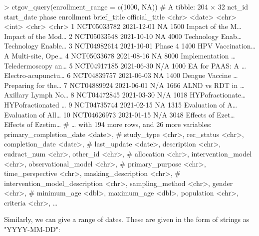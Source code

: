 \begin{example}
> ctgov_query(enrollment_range = c(1000, NA))
# A tibble: 204 × 32
   nct_id      start_date phase   enrollment brief_title      official_title
   <chr>       <date>     <chr>        <int> <chr>            <chr>
 1 NCT05033782 2021-12-01 NA            1500 Impact of the M… Impact of the Mod…
 2 NCT05033548 2021-10-10 NA            4000 Technology Enab… Technology Enable…
 3 NCT04982614 2021-10-01 Phase 4       1400 HPV Vaccination… A Multi-site, Ope…
 4 NCT05033678 2021-08-16 NA            8000 Implementation … Teledermoscopy an…
 5 NCT04917185 2021-06-30 N/A           1000 EA for PAAS: A … Electro-acupunctu…
 6 NCT04839757 2021-06-03 NA            1400 Dengue Vaccine … Preparing for the…
 7 NCT04889924 2021-06-01 N/A           1666 ALND vs RDT in … Axillary Lymph No…
 8 NCT04472845 2021-03-30 N/A           1018 HYPofractionate… HYPofractionated …
 9 NCT04735744 2021-02-15 NA            1315 Evaluation of A… Evaluation of All…
10 NCT04626973 2021-01-15 N/A           3048 Effects of Ezet… Effects of Ezetim…
# … with 194 more rows, and 26 more variables: primary_completion_date <date>,
#   study_type <chr>, rec_status <chr>, completion_date <date>,
#   last_update <date>, description <chr>, eudract_num <chr>, other_id <chr>,
#   allocation <chr>, intervention_model <chr>, observational_model <chr>,
#   primary_purpose <chr>, time_perspective <chr>, masking_description <chr>,
#   intervention_model_description <chr>, sampling_method <chr>, gender <chr>,
#   minimum_age <dbl>, maximum_age <dbl>, population <chr>, criteria <chr>, …
\end{example}

Similarly, we can give a range of dates. These are given in the form of strings
as "YYYY-MM-DD":

